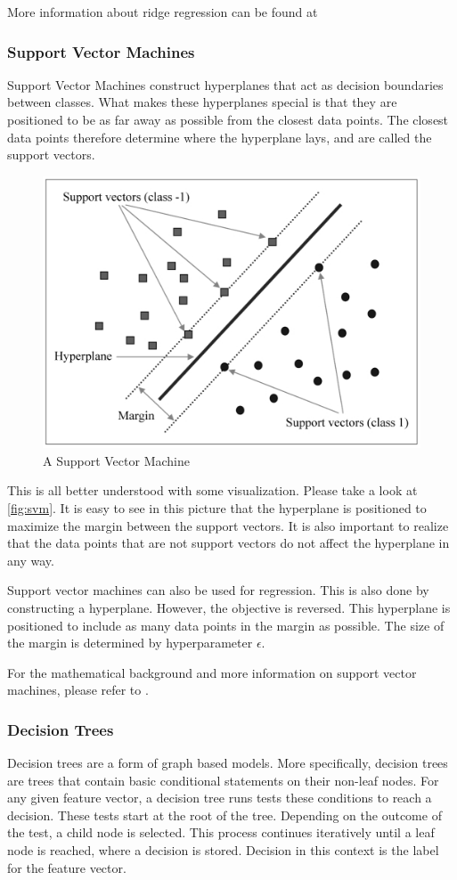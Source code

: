 More information about ridge regression can be found at \parencite{homl:4}

\subsubsection{Support Vector Machines}
Support Vector Machines construct hyperplanes that act as decision boundaries between classes.
What makes these hyperplanes special is that they are positioned to be as far away as possible from the closest data points.
The closest data points therefore determine where the hyperplane lays, and are called the support vectors. \parencite{homl:5}

\begin{figure}
	\centering
	\includegraphics[width=0.5\linewidth]{figures/svm}
	\caption{A Support Vector Machine \parencite{svm_pic}}
	\label{fig:svm}
\end{figure}

This is all better understood with some visualization. 
Please take a look at \autoref{fig:svm}.
It is easy to see in this picture that the hyperplane is positioned to maximize the margin between the support vectors.
It is also important to realize that the data points that are not support vectors do not affect the hyperplane in any way. \parencite{homl:5}

Support vector machines can also be used for regression.
This is also done by constructing a hyperplane.
However, the objective is reversed.
This hyperplane is positioned to include as many data points in the margin as possible.
The size of the margin is determined by hyperparameter $\epsilon$. \parencite{homl:5}

For the mathematical background and more information on support vector machines, please refer to \parencite{homl:5}.

\subsubsection{Decision Trees}
Decision trees are a form of graph based models.\parencite{ml:prml}
More specifically, decision trees are trees that contain basic conditional statements on their non-leaf nodes.
For any given feature vector, a decision tree runs tests these conditions to reach a decision.
These tests start at the root of the tree.
Depending on the outcome of the test, a child node is selected.
This process continues iteratively until a leaf node is reached, where a decision is stored.
Decision in this context is the label for the feature vector.\parencite{ai:ml}


